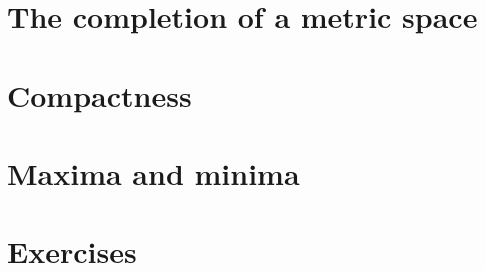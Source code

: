 \documentclass[12 pt]{article}
\numberwithin{equation}{section}
\begin{document}
{\section{The completion of a metric space}













\section{Compactness}

















\section{Maxima and minima}
















\section{Exercises}



}
\end{document}
